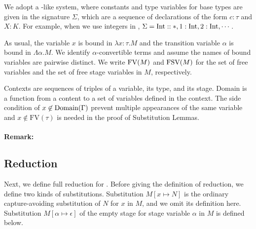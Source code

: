 
We adopt a \LLF-like system, where constants and type variables for base types  are given in the signature $\Sigma$, which 
are a sequence of declarations of the form $c:\tau$ and $X:K$.
For example, when we use integers in \LMD, $\Sigma = \textrm{Int} :: *, 1:\textrm{Int}, 2:\textrm{Int}, \cdots$.  

As usual, the variable $x$ is bound in $\lambda x:\tau.M$
and the transition variable $\alpha$ is bound in $\Lambda \alpha.M$.
We identify $\alpha$-convertible terms and assume the names of bound variables are pairwise distinct.
We write $\text{FV}(M)$ and $\text{FSV}(M)$ for the set of free variables and the set of free stage variables in $M$, respectively.

Contexts  are sequences of triples of a variable, its type, and its stage.
$\textrm{Domain}$ is a function from a content to a set of variables defined in the context.
The side condition of $x\not\in\textrm{Domain}(\Gamma)$ prevent multiple appearances of the same variable and
$x\not\in\textrm{FV}(\tau)$ is needed in the proof of Substitution Lemmas.

\paragraph{Remark:}  

\subsection{Reduction}

Next, we define full reduction for \LMD.
Before giving the definition of reduction, we define two kinds of substitutions.
Substitution $M[x\mapsto N]$ is the ordinary capture-avoiding substitution of
$N$ for $x$ in $M$, and we omit its definition here.
Substitution $M[\alpha \mapsto \epsilon]$ of the empty stage
for stage variable $\alpha$ in $M$ is defined below.



